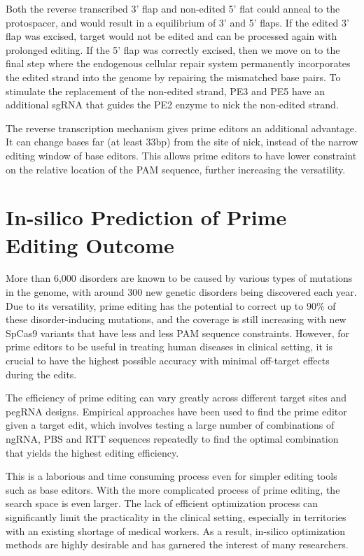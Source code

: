 Both the reverse transcribed 3' flap and non-edited 5' flat could anneal to the protospacer, and would result in a equilibrium of 3' and 5' flaps. If the edited 3' flap was excised, target would not be edited and can be processed again with prolonged editing. If the 5' flap was correctly excised, then we move on to the final step where the endogenous cellular repair system permanently incorporates the edited strand into the genome by repairing the mismatched base pairs. To stimulate the replacement of the non-edited strand, PE3 and PE5 have an additional sgRNA that guides the PE2 enzyme to nick the non-edited strand.

The reverse transcription mechanism gives prime editors an additional advantage. It can change bases far (at least 33bp) from the site of nick, instead of the narrow editing window of base editors. This allows prime editors to have lower constraint on the relative location of the PAM sequence, further increasing the versatility\cite{liuPrimeEditingPrecise2023}.

\section{In-silico Prediction of Prime Editing Outcome}

\label{sec:motivation}

More than 6,000 disorders are known to be caused by various types of mutations in the genome, with around 300 new genetic disorders being discovered each year\cite{petraityteGenomeEditingMedicine2021}. Due to its versatility, prime editing has the potential to correct up to 90\% of these disorder-inducing mutations\cite{kantorCRISPRCas9DNABaseEditing2020}, and the coverage is still increasing with new SpCas9 variants that have less and less PAM sequence constraints\cite{waltonUnconstrainedGenomeTargeting2020}. However, for prime editors to be useful in treating human diseases in clinical setting, it is crucial to have the highest possible accuracy with minimal off-target effects during the edits. 

The efficiency of prime editing can vary greatly across different target sites and pegRNA designs\cite{liudavidr.SearchandreplaceGenomeEditing2019}. Empirical approaches have been used to find the prime editor given a target edit, which involves testing a large number of combinations of ngRNA, PBS and RTT sequences repeatedly to find the optimal combination that yields the highest editing efficiency.

This is a laborious and time consuming process even for simpler editing tools such as base editors. With the more complicated process of prime editing, the search space is even larger. The lack of efficient optimization process can significantly limit the practicality in the clinical setting, especially in territories with an existing shortage of medical workers. As a result, in-silico optimization methods are highly desirable and has garnered the interest of many researchers.

